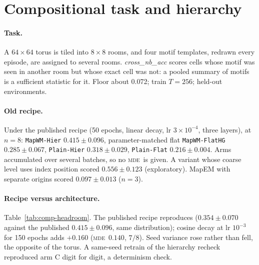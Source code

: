 \documentclass[10pt]{article}
\newcommand{\mde}{\textsc{mde}}
\newcommand{\arm}[1]{\texttt{#1}}
\begin{document}
\section{Compositional task and hierarchy}
\label{app:comp}

\paragraph{Task.} A $64\times64$ torus is tiled into $8\times8$ rooms, and four motif templates, redrawn every
episode, are assigned to several rooms. \emph{cross\_nb\_acc} scores cells whose motif was seen in another room
but whose exact cell was not: a pooled summary of motifs is a sufficient statistic for it. Floor about 0.072;
train $T=256$; held-out environments. %

\paragraph{Old recipe.} Under the published recipe (50 epochs, linear decay, lr $3\times10^{-4}$, three layers),
at $n=8$: \arm{MapWM-Hier} $0.415\pm0.096$, parameter-matched flat \arm{MapWM-FlatHG} $0.285\pm0.067$,
\arm{Plain-Hier} $0.318\pm0.029$, \arm{Plain-Flat} $0.216\pm0.004$. Arms accumulated over several batches, so
no \mde\ is given. A variant whose coarse level uses index position scored $0.556\pm0.123$ (exploratory).
MapEM with separate origins scored $0.097\pm0.013$ ($n=3$). %

\paragraph{Recipe versus architecture.} Table~\ref{tab:comp-headroom}. The published recipe reproduces
($0.354\pm0.070$ against the published $0.415\pm0.096$, same distribution); cosine decay at lr $10^{-3}$ for 150
epochs adds $+0.160$ (\mde\ $0.140$, $7/8$). Seed variance rose rather than fell, the opposite of the torus.
A same-seed retrain of the hierarchy recheck reproduced arm C digit for digit, a determinism check.
\end{document}
